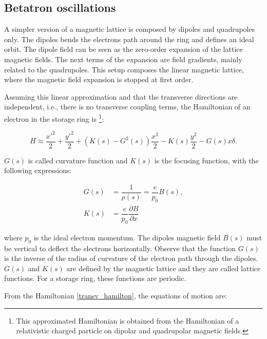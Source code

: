 \subsection{Betatron oscillations}

A simpler version of a magnetic lattice is composed by dipoles and quadrupoles only. The dipoles bends the electrons path around the ring and defines an ideal orbit. The dipole field can be seen as the zero-order expansion of the lattice magnetic fields. The next terms of the expansion are field gradients, mainly related to the quadrupoles. This setup composes the linear magnetic lattice, where the magnetic field expansion is stopped at first order.

Assuming this linear approximation and that the transverse directions are independent, i.e., there is no transverse coupling terms, the Hamiltonian of an electron in the storage ring is \footnote{This approximated Hamiltonian is obtained from the Hamiltonian of a relativistic charged particle on dipolar and quadrupolar magnetic fields.}:

\begin{equation}
    H \approx \dfrac{{x'}^2}{2} + \dfrac{{y'}^2}{2} + \left(K(s)- G^{2}(s)\right)\dfrac{{x}^2}{2} - K(s) \frac{y^2}{2} - G(s) x \delta.
    \label{transv_hamilton}
\end{equation}

$G(s)$ is called curvature function and $K(s)$ is the focusing function, with the following expressions:

\begin{align}
    G(s) &= \dfrac{1}{\rho(s)} = \dfrac{e}{p_0}B(s), \\
    K(s) &= \dfrac{e}{p_0}\dfrac{\partial B}{\partial x}
\end{align}

where $p_0$ is the ideal electron momentum. The dipoles magnetic field $B(s)$ must be vertical to deflect the electrons horizontally. Observe that the function $G(s)$ is the inverse of the radius of curvature of the electron path through the dipoles. $G(s)$ and $K(s)$ are defined by the magnetic lattice and they are called lattice functions. For a storage ring, these functions are periodic. 


From the Hamiltonian \eqref{transv_hamilton}, the equations of motion are:

